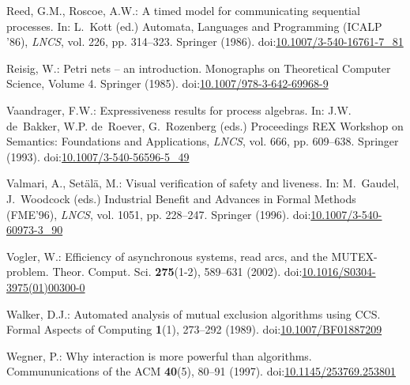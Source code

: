 \documentclass[smallcondensed]{svjour3}
\providecommand{\urlalt}[2]{\href{#1}{#2}}
\providecommand{\doi}[1]{doi:\urlalt{http://dx.doi.org/#1}{#1}}
\begin{document}
\begin{thebibliography}{10}
Reed, G.M., Roscoe, A.W.: A timed model for communicating sequential processes.
\newblock In: L.~Kott (ed.) Automata, Languages and Programming (ICALP '86),
  \emph{\rm LNCS}, vol. 226, pp. 314--323. Springer (1986).
\newblock \doi{10.1007/3-540-16761-7\_81}

Reisig, W.: Petri nets -- an introduction.
 Monographs on Theoretical Computer Science, Volume 4.
  Springer (1985).
\newblock \doi{10.1007/978-3-642-69968-9}

Vaandrager, F.W.: Expressiveness results for process algebras.
\newblock In: J.W. de~Bakker, W.P. de~Roever, G.~Rozenberg (eds.) Proceedings
  REX Workshop on Semantics: Foundations and Applications, \emph{\rm LNCS},
  vol. 666, pp. 609--638. Springer (1993).
\newblock \doi{10.1007/3-540-56596-5\_49}

Valmari, A., Set\"{a}l\"{a}, M.: Visual verification of safety and liveness.
\newblock In: M.~Gaudel, J.~Woodcock (eds.) Industrial Benefit and Advances in
  Formal Methods (FME'96), \emph{\rm LNCS}, vol. 1051, pp. 228--247. Springer
  (1996).
\newblock \doi{10.1007/3-540-60973-3\_90}

Vogler, W.: Efficiency of asynchronous systems, read arcs, and the
  {MUTEX}-problem.
\newblock Theor. Comput. Sci. \textbf{275}(1-2), 589--631 (2002).
\newblock \doi{10.1016/S0304-3975(01)00300-0}

Walker, D.J.: Automated analysis of mutual exclusion algorithms using {CCS}.
\newblock Formal Aspects of Computing \textbf{1}(1), 273--292 (1989).
\newblock \doi{10.1007/BF01887209}

Wegner, P.: Why interaction is more powerful than algorithms.
\newblock Commununications of the ACM \textbf{40}(5), 80--91 (1997).
\newblock \doi{10.1145/253769.253801}

\end{thebibliography}
\end{document}
